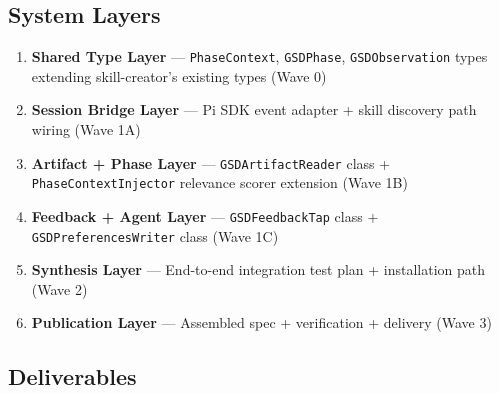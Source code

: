 \documentclass[11pt,letterpaper]{article}
\begin{document}
\subsection{System Layers}

\begin{enumerate}
  \item \textbf{Shared Type Layer} --- \texttt{PhaseContext}, \texttt{GSDPhase}, \texttt{GSDObservation} types extending skill-creator's existing types (Wave 0)
  \item \textbf{Session Bridge Layer} --- Pi SDK event adapter + skill discovery path wiring (Wave 1A)
  \item \textbf{Artifact + Phase Layer} --- \texttt{GSDArtifactReader} class + \texttt{PhaseContextInjector} relevance scorer extension (Wave 1B)
  \item \textbf{Feedback + Agent Layer} --- \texttt{GSDFeedbackTap} class + \texttt{GSDPreferencesWriter} class (Wave 1C)
  \item \textbf{Synthesis Layer} --- End-to-end integration test plan + installation path (Wave 2)
  \item \textbf{Publication Layer} --- Assembled spec + verification + delivery (Wave 3)
\end{enumerate}

\subsection{Deliverables}
\end{document}
